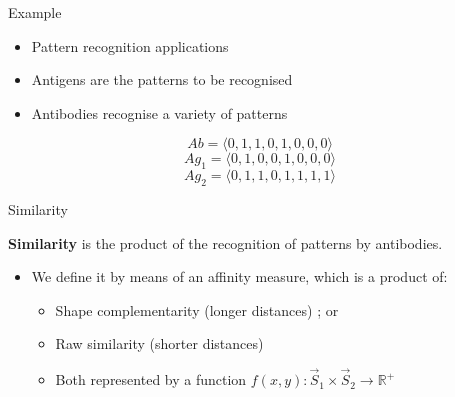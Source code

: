 \documentclass[xcolor=svgnames]{beamer}
\begin{document}
      	\begin{frame}{Example}
      	
            
            \begin{itemize}
                \item Pattern recognition applications
                \item Antigens are the patterns to be recognised
                \item Antibodies recognise a variety of patterns
            \end{itemize}            
            \vspace{1em}
            
            $$Ab = \langle 0, 1, 1, 0, 1, 0, 0, 0 \rangle$$
            $$Ag_{1} = \langle 0, 1, 0, 0, 1, 0, 0, 0 \rangle$$
            $$Ag_{2} = \langle 0, 1, 1, 0, 1, 1, 1, 1 \rangle$$
            
            
		\end{frame}
      
        \begin{frame}{Similarity}            
        	
        	\textbf{Similarity} is the product of the recognition of patterns by antibodies.
        	\vspace{1em}
            \begin{itemize}
				\item We define it by means of an affinity measure, which is a product of:
                \begin{itemize}
                    \item Shape complementarity (longer distances) ; or %
                    \item Raw similarity (shorter distances) %
                \end{itemize}
				\vspace{0.5em}
				\begin{itemize}
					\item Both represented by a function $f(x,y): \vec{S}_1 \times \vec{S}_2 \rightarrow \mathbb{R}^+$
				\end{itemize}
        	\end{itemize}    
        \end{frame}
		
\end{document}
